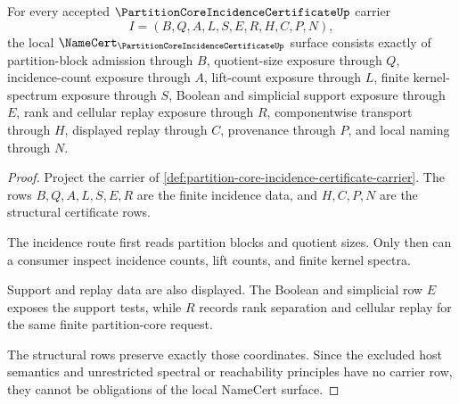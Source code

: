 \begin{theorem}
\label{thm:partition-core-incidence-certificate-obligations}
For every accepted $\PartitionCoreIncidenceCertificateUp$ carrier
$$
I=(B,Q,A,L,S,E,R,H,C,P,N),
$$
the local $\NameCert_{\PartitionCoreIncidenceCertificateUp}$ surface consists exactly of partition-block admission through $B$, quotient-size exposure through $Q$, incidence-count exposure through $A$, lift-count exposure through $L$, finite kernel-spectrum exposure through $S$, Boolean and simplicial support exposure through $E$, rank and cellular replay exposure through $R$, componentwise transport through $H$, displayed replay through $C$, provenance through $P$, and local naming through $N$.
\end{theorem}
\begin{proof}
Project the carrier of \autoref{def:partition-core-incidence-certificate-carrier}. The rows $B,Q,A,L,S,E,R$ are the finite incidence data, and $H,C,P,N$ are the structural certificate rows.

The incidence route first reads partition blocks and quotient sizes. Only then can a consumer inspect incidence counts, lift counts, and finite kernel spectra.

Support and replay data are also displayed. The Boolean and simplicial row $E$ exposes the support tests, while $R$ records rank separation and cellular replay for the same finite partition-core request.

The structural rows preserve exactly those coordinates. Since the excluded host semantics and unrestricted spectral or reachability principles have no carrier row, they cannot be obligations of the local NameCert surface.
\end{proof}

